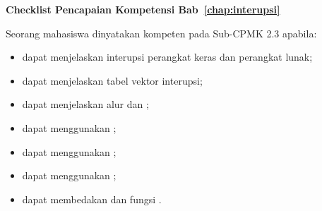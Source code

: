 \begin{checklistbox}
\vspace{1.1em}
\textbf{Checklist Pencapaian Kompetensi
Bab~\ref{chap:interupsi}}

Seorang mahasiswa dinyatakan kompeten pada Sub-CPMK 2.3 apabila:
\begin{itemize}
    \item[\checked] dapat menjelaskan interupsi perangkat keras dan
          perangkat lunak;
    \item[\checked] dapat menjelaskan tabel vektor interupsi;
    \item[\checked] dapat menjelaskan alur  dan
          ;
    \item[\checked] dapat menggunakan ;
    \item[\checked] dapat menggunakan ;
    \item[\checked] dapat menggunakan ;
    \item[\checked] dapat membedakan  dan
           fungsi .
\end{itemize}
\end{checklistbox}
